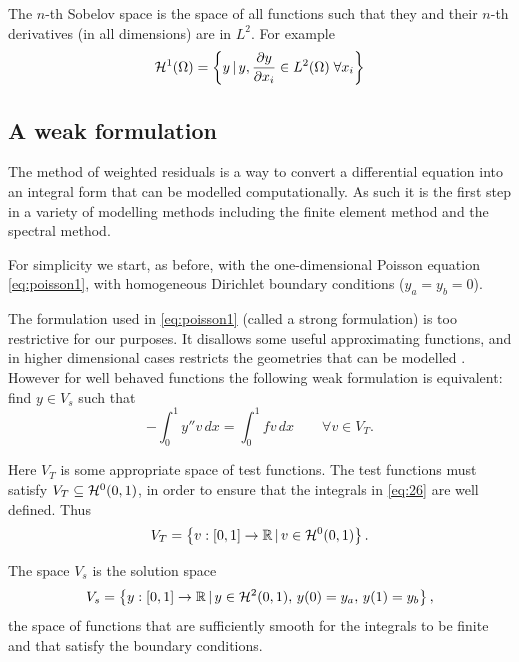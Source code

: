 The $n$-th Sobelov space is the space of all functions such that they and their $n$-th derivatives (in all dimensions) are in $L^2$. For example
\begin{equation}
  \label{eq:H1}
  \mathcal{H}^1(\Omega) = \left\{ { y \,|\, y, \frac{\partial y}{\partial x_i} \in L^2(\Omega) \; \forall x_i } \right\}
\end{equation}

\subsection{A weak formulation}
\label{Derivation-of-weighted-residuals}

The method of weighted residuals is a way to convert a differential equation
into an integral form that can be modelled computationally. As such it is the
first step in a variety of modelling methods including the finite element method
and the spectral method.

For simplicity we start, as before, with the one-dimensional Poisson equation
\eqref{eq:poisson1}, with homogeneous Dirichlet boundary conditions
(\ie $y_{a}=y_{b}=0$).

The formulation used in \eqref{eq:poisson1} (called a strong formulation) is too restrictive for our purposes.
It disallows some useful approximating functions, and in higher dimensional cases restricts the geometries that can be modelled \cite{HowardElmanDavidSilvester2006}. 
However for well behaved functions the following weak formulation is equivalent: find $y\in V_{s}$ such that
\begin{equation}
  -\int_{0}^{1}y''v\, dx=\int_{0}^{1}fv\, dx \qquad \forall v\in V_{T}.
  \label{eq:26}
\end{equation}

Here $V_{T}$ is some appropriate space of test functions. The test
functions must satisfy $V_{T}\subseteq \mathcal{H}^0(0,1)$, in order to ensure that the integrals in \eqref{eq:26} are well defined. 
Thus
\begin{equation}
  \label{eq:28}
  V_{T}=\left\{ {v : [0,1] \rightarrow \mathbb{R} \,|\, v \in \mathcal{H}^0(0,1)} \right\}.
\end{equation}

The space $V_{s}$ is the solution space
\begin{equation}
  V_{s}=\left\{ { y : [0,1] \rightarrow \mathbb{R} \,|\, y \in \mathcal{H}^2(0,1),\, y(0) = y_{a},\, y(1) = y_{b}} \right\},
\end{equation}
\ie the space of functions that are sufficiently smooth for the integrals to be finite and that satisfy the boundary conditions.

